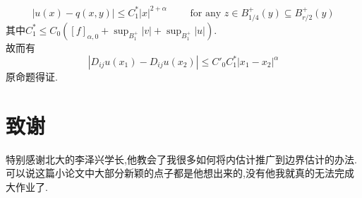 \documentclass[12pt,A4paper,reqno]{amsart}
\numberwithin{equation}{section}
\theoremstyle{plain}
\theoremstyle{plain}
\theoremstyle{plain}
\numberwithin{equation}{section}
\theoremstyle{remark}
\begin{document}
	$$|u(x)-q(x,y)|\leqslant C^{*}_1|x|^{2+\alpha}\qquad\text{ for any } z \in B_{1/4}^{+}(y) \subseteq B_{r/2}^{+}(y)$$
	其中$C_1^{*}\leqslant C_0([f]_{\alpha, 0}+\sup _{B_{1}^{+}} |v|+\sup _{B_{1}^{+}} |u|)$.\\
	故而有
	$$\left|D_{i j} u\left(x_{1}\right)-D_{i j} u\left(x_{2}\right)\right| \leq C'_0C_1^{*}\left|x_{1}-x_{2}\right|^{\alpha}$$
	原命题得证.
\section{致谢}
特别感谢北大的李泽兴学长,他教会了我很多如何将内估计推广到边界估计的办法.可以说这篇小论文中大部分新颖的点子都是他想出来的,没有他我就真的无法完成大作业了.


















\nocite{gilbarg2015elliptic}
\nocite{陈亚浙1991}
\nocite{calderon1989local}
\end{document}
